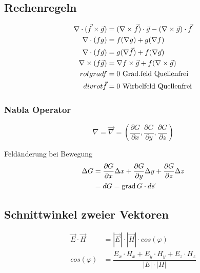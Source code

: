 \subsection{Rechenregeln}
\begin{align*}
    \nabla \cdot ( \vec{f} \times \vec{g}) & = ( \nabla \times \vec{f}) \cdot \vec{g} - ( \nabla \times \vec{g}) \cdot \vec{f} \\
    \nabla \cdot (fg) & = f( \nabla g) + g( \nabla f)\\
    \nabla \cdot (f \vec{g} ) & = g( \nabla \vec{f}) + f( \nabla \vec{g})\\
    \nabla \times (f \vec{g}) & = \nabla f \times \vec{g} + f( \nabla \times \vec{g} )\\
    rot grad f & = 0 \textnormal{ Grad.feld Quellenfrei}\\
    div rot \vec{f} & = 0 \textnormal{ Wirbelfeld Quellenfrei}
\end{align*}


\subsubsection*{Nabla Operator}
\[
    \nabla = \vec{\nabla} = \left( \dfrac{\partial G}{\partial x},
    \dfrac{\partial G}{\partial y}, \dfrac{\partial G}{\partial z} \right)
\]

Feldänderung bei Bewegung
\begin{align*}
    \Delta G & = \dfrac{\partial G}{\partial x} \Delta x + \dfrac{\partial G}{\partial y} \Delta y + \dfrac{\partial G}{\partial z} \Delta z \\
             & = dG = \operatorname{grad} G \cdot d \vec{s}
\end{align*}

\subsection{Schnittwinkel zweier Vektoren}
\begin{align*}
    \vec{E} \cdot \vec{H} & = |\vec{E}| \cdot |\vec{H}| \cdot cos(\varphi)                         \\
    cos(\varphi)          & = \dfrac{E_x \cdot H_x + E_y \cdot H_y + E_z \cdot H_z}{|E| \cdot |H|}
\end{align*}

